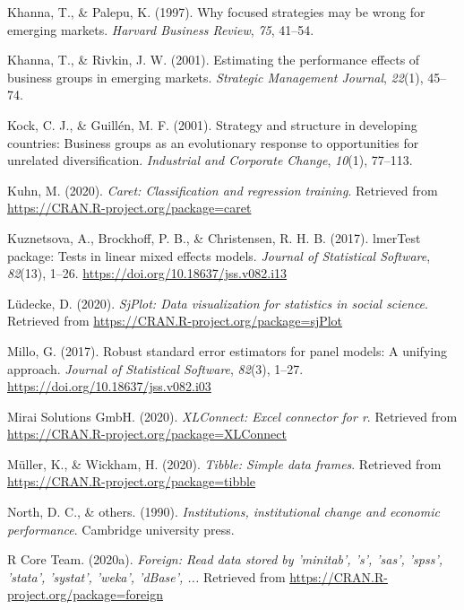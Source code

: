 \documentclass[
  english,
  man]{apa6}
\begin{document}
\leavevmode\hypertarget{ref-khanna1997focused}{}%
Khanna, T., \& Palepu, K. (1997). Why focused strategies may be wrong for emerging markets. \emph{Harvard Business Review}, \emph{75}, 41--54.

\leavevmode\hypertarget{ref-khanna2001estimating}{}%
Khanna, T., \& Rivkin, J. W. (2001). Estimating the performance effects of business groups in emerging markets. \emph{Strategic Management Journal}, \emph{22}(1), 45--74.

\leavevmode\hypertarget{ref-kock2001strategy}{}%
Kock, C. J., \& Guillén, M. F. (2001). Strategy and structure in developing countries: Business groups as an evolutionary response to opportunities for unrelated diversification. \emph{Industrial and Corporate Change}, \emph{10}(1), 77--113.

\leavevmode\hypertarget{ref-R-caret}{}%
Kuhn, M. (2020). \emph{Caret: Classification and regression training}. Retrieved from \url{https://CRAN.R-project.org/package=caret}

\leavevmode\hypertarget{ref-R-lmerTest}{}%
Kuznetsova, A., Brockhoff, P. B., \& Christensen, R. H. B. (2017). lmerTest package: Tests in linear mixed effects models. \emph{Journal of Statistical Software}, \emph{82}(13), 1--26. \url{https://doi.org/10.18637/jss.v082.i13}

\leavevmode\hypertarget{ref-R-sjPlot}{}%
Lüdecke, D. (2020). \emph{SjPlot: Data visualization for statistics in social science}. Retrieved from \url{https://CRAN.R-project.org/package=sjPlot}

\leavevmode\hypertarget{ref-R-plm_b}{}%
Millo, G. (2017). Robust standard error estimators for panel models: A unifying approach. \emph{Journal of Statistical Software}, \emph{82}(3), 1--27. \url{https://doi.org/10.18637/jss.v082.i03}

\leavevmode\hypertarget{ref-R-XLConnect}{}%
Mirai Solutions GmbH. (2020). \emph{XLConnect: Excel connector for r}. Retrieved from \url{https://CRAN.R-project.org/package=XLConnect}

\leavevmode\hypertarget{ref-R-tibble}{}%
Müller, K., \& Wickham, H. (2020). \emph{Tibble: Simple data frames}. Retrieved from \url{https://CRAN.R-project.org/package=tibble}

\leavevmode\hypertarget{ref-north1990institutions}{}%
North, D. C., \& others. (1990). \emph{Institutions, institutional change and economic performance}. Cambridge university press.

\leavevmode\hypertarget{ref-R-foreign}{}%
R Core Team. (2020a). \emph{Foreign: Read data stored by 'minitab', 's', 'sas', 'spss', 'stata', 'systat', 'weka', 'dBase', ...} Retrieved from \url{https://CRAN.R-project.org/package=foreign}
\end{document}
